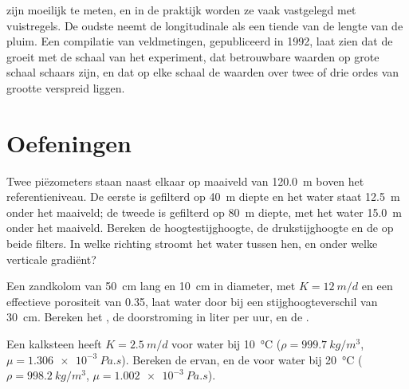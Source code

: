  zijn moeilijk te meten, en in de praktijk worden ze vaak vastgelegd met
vuistregels. De oudste neemt de longitudinale  als een tiende van
de lengte van de pluim. Een compilatie van veldmetingen, gepubliceerd in
1992, laat zien dat de  groeit met de schaal van het experiment,
dat betrouwbare waarden op grote schaal schaars zijn, en dat op elke schaal de
waarden over twee of drie ordes van grootte verspreid liggen.

\section{Oefeningen}

\begin{exercise}[$\star$]\label{exo:b3:hydrogeology:1}
Twee piëzometers staan naast elkaar op maaiveld van \qty{120.0}{m} boven het
referentieniveau. De eerste is gefilterd op \qty{40}{m} diepte en het water staat
\qty{12.5}{m} onder het maaiveld; de tweede is gefilterd op \qty{80}{m}
diepte, met het water \qty{15.0}{m} onder het maaiveld. Bereken de hoogtestijghoogte, de
drukstijghoogte en de  op beide filters. In welke richting stroomt het water
tussen hen, en onder welke verticale gradiënt?
\end{exercise}

\begin{exercise}[$\star$]\label{exo:b3:hydrogeology:2}
Een zandkolom van \qty{50}{cm} lang en \qty{10}{cm} in diameter, met $K =
\qty{12}{m/d}$ en een effectieve porositeit van 0.35, laat water door bij een
stijghoogteverschil van \qty{30}{cm}. Bereken het , de doorstroming
in liter per uur, en de .
\end{exercise}

\begin{exercise}[$\star$]\label{exo:b3:hydrogeology:3}
Een kalksteen heeft $K = \qty{2.5}{m/d}$ voor water bij \qty{10}{\celsius}
($\rho = \qty{999.7}{kg/m^3}$, $\mu = \qty{1.306e-3}{Pa.s}$). Bereken de  ervan,
en de  voor water bij
\qty{20}{\celsius} ($\rho = \qty{998.2}{kg/m^3}$, $\mu =
\qty{1.002e-3}{Pa.s}$).
\end{exercise}

